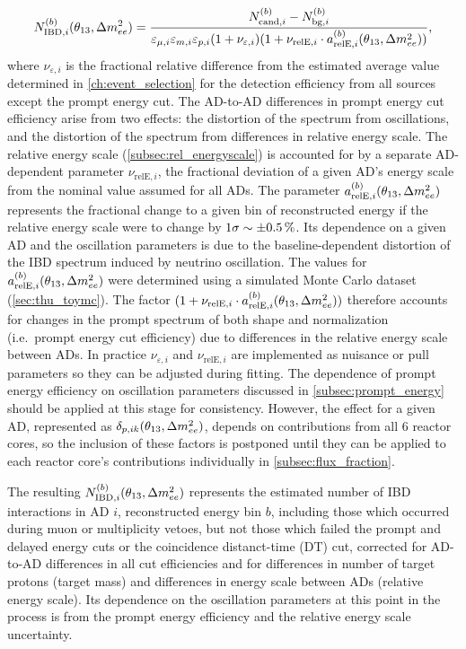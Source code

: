\begin{equation}\label{eq:near_hall_bg_eff}
    N_{\text{IBD},i}^{(b)}(\theta_{13}, \Delta m^2_{ee}) =
    \frac{N_{\text{cand},i}^{(b)} - N_{\text{bg},i}^{(b)}}{
        \varepsilon_{\mu,i}\varepsilon_{m,i}\varepsilon_{p,i}(1+\nu_{\varepsilon,i})
        (1 + \nu_{\text{relE},i}\cdot a_{\text{relE},i}^{(b)}(\theta_{13}, \Delta m^2_{ee}))
    },
\end{equation}
where $\nu_{\varepsilon,i}$ is the fractional relative difference from
the estimated average value determined in \cref{ch:event_selection}
for the detection efficiency from all sources except the prompt energy cut.
The AD-to-AD differences in prompt energy cut efficiency arise from two effects:
the distortion of the spectrum from oscillations,
and the distortion of the spectrum from differences
in relative energy scale.
The relative energy scale (\cref{subsec:rel_energyscale})
is accounted for by a separate AD-dependent parameter $\nu_{\text{relE},i}$,
the fractional deviation of a given AD's energy scale
from the nominal value assumed for all ADs.
The parameter $a_{\text{relE},i}^{(b)}(\theta_{13}, \Delta m^2_{ee})$
represents the fractional change to a given bin of reconstructed energy
if the relative energy scale were to change by $1\sigma \sim \SI{+-0.5}{\percent}$.
Its dependence on a given AD and the oscillation parameters is
due to the baseline-dependent distortion of the IBD spectrum
induced by neutrino oscillation.
The values for $a_{\text{relE},i}^{(b)}(\theta_{13}, \Delta m^2_{ee})$ were determined using
a simulated Monte Carlo dataset (\cref{sec:thu_toymc}).
The factor $(1 + \nu_{\text{relE},i}\cdot a_{\text{relE},i}^{(b)}(\theta_{13},\Delta m^2_{ee}))$
therefore accounts for changes in the prompt spectrum of
both shape and normalization (i.e.\ prompt energy cut efficiency)
due to differences in the relative energy scale between ADs.
In practice $\nu_{\varepsilon,i}$ and $\nu_{\text{relE},i}$
are implemented as nuisance or pull parameters
so they can be adjusted during fitting.
The dependence of prompt energy efficiency on oscillation parameters
discussed in \cref{subsec:prompt_energy}
should be applied at this stage for consistency.
However, the effect for a given AD, represented as $\delta_{p,ik}(\theta_{13}, \Delta m^2_{ee})$,
depends on contributions from all 6 reactor cores,
so the inclusion of these factors is postponed
until they can be applied to each reactor core's contributions
individually in \cref{subsec:flux_fraction}.

The resulting $N_{\text{IBD},i}^{(b)}(\theta_{13}, \Delta m^2_{ee})$ represents
the estimated number of IBD interactions in AD $i$,
reconstructed energy bin $b$,
including those which occurred during muon or multiplicity vetoes,
but not those which failed the prompt and delayed energy cuts
or the coincidence distanct-time (DT) cut,
corrected for AD-to-AD differences in all cut efficiencies
and for differences in number of target protons (target mass)
and differences in energy scale between ADs (relative energy scale).
Its dependence on the oscillation parameters at this point in the process
is from the prompt energy efficiency
and the relative energy scale uncertainty.


